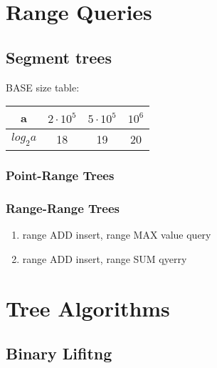 \documentclass[13pt]{article}
\begin{document}


\section{Range Queries}

\subsection{Segment trees}

BASE size table:
\begin{center}
	\begin{tabular}{ c || c | c | c }
		a          & \(2 \cdot 10^5\) & \(5 \cdot 10^5\) & \(10^6\) \\
		\hline\hline
		\(log_2a\) & 18               & 19               & 20
	\end{tabular}
\end{center}

\subsubsection{Point-Range Trees}



\subsubsection{Range-Range Trees}
\begin{enumerate}
	\item range ADD insert, range MAX value query
	      
	      
	\item range ADD insert, range SUM qyerry
	      
	      
\end{enumerate}
\section{Tree Algorithms}

\subsection{Binary Lifitng}\label{sub:binary_lifitng} %

\end{document}

